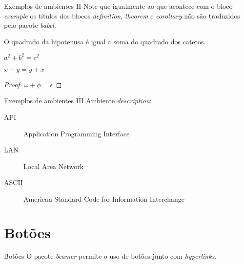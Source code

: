 \documentclass[red]{beamer}
\begin{document}
		\label{amb2}
		\begin{frame}{Exemplos de ambientes II}
			Note que igualmente ao que acontece com o bloco \textit{example} os títulos dos blocos \textit{definition}, \textit{theorem} e \textit{corollary} não são traduzidos pelo pacote \textit{babel}.
			
			\begin{definition}
				O quadrado da hipotenusa é igual a soma do quadrado dos catetos. 
			\end{definition}
			
			\begin{theorem}[Pitágoras]
				$ a^2 + b^2 = c^2$
			\end{theorem}
			
			\begin{corollary}
				$ x + y = y + x  $
			\end{corollary}
			
			\begin{proof}
				$\omega +\phi = \epsilon $
			\end{proof}
		\end{frame}
		
		\begin{frame}{Exemplos de ambientes III}
			Ambiente \textit{description}:
			
			\begin{description}
				\item[API] Application Programming Interface
				\item[LAN] Local Area Network
				\item[ASCII] American Standard Code for Information Interchange
			\end{description}
		\end{frame}
		
		\section{Botões}
			\begin{frame}{Botões}
				O pacote \textit{beamer} permite o uso de botões junto com \textit{hyperlinks}.
				
				\begin{center}
					\hyperlink{amb1}{}\\
					\hyperlink{amb2}{}\\
					\hyperlink{title}{}\\
					\hyperlink{perg}{}
				\end{center}				
			\end{frame}
		
\end{document}
